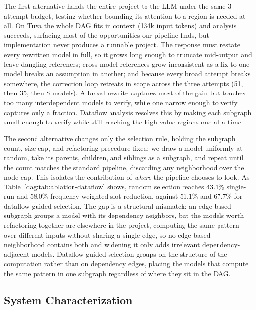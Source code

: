 The first alternative hands the entire project to the LLM under the same 3-attempt budget, testing whether bounding its attention to a region is needed at all. On Tuva the whole DAG fits in context (134k input tokens) and analysis succeeds, surfacing most of the opportunities our pipeline finds, but implementation never produces a runnable project. The response must restate every rewritten model in full, so it grows long enough to truncate mid-output and leave dangling references; cross-model references grow inconsistent as a fix to one model breaks an assumption in another; and because every broad attempt breaks somewhere, the correction loop retreats in scope across the three attempts (51, then 35, then 8 models). A broad rewrite captures most of the gain but touches too many interdependent models to verify, while one narrow enough to verify captures only a fraction. Dataflow analysis resolves this by making each subgraph small enough to verify while still reaching the high-value regions one at a time.

 The second alternative changes only the selection rule, holding the subgraph count, size cap, and refactoring procedure fixed: we draw a model uniformly at random, take its parents, children, and siblings as a subgraph, and repeat until the count matches the standard pipeline, discarding any neighborhood over the node cap. This isolates the contribution of \emph{where} the pipeline chooses to look. As Table~\ref{dag:tab:ablation-dataflow} shows, random selection reaches 43.1\% single-run and 58.0\% frequency-weighted slot reduction, against 51.1\% and 67.7\% for dataflow-guided selection. The gap is a structural mismatch: an edge-based subgraph groups a model with its dependency neighbors, but the models worth refactoring together are elsewhere in the project, computing the same pattern over different inputs without sharing a single edge, so no edge-based neighborhood contains both and widening it only adds irrelevant dependency-adjacent models. Dataflow-guided selection groups on the structure of the computation rather than on dependency edges, placing the models that compute the same pattern in one subgraph regardless of where they sit in the DAG.
 
 








\subsection{System Characterization}
\label{dag:sec:eval-system}

